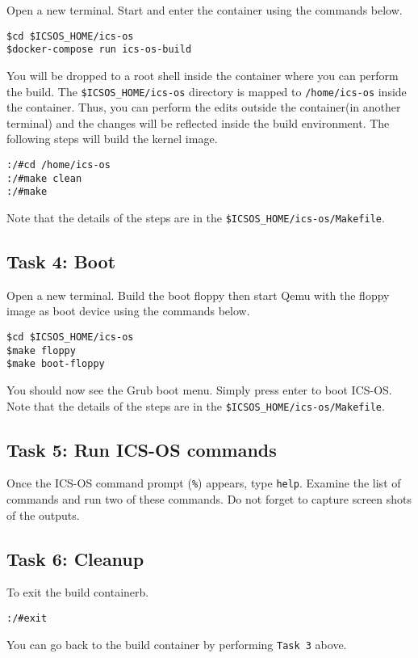 \documentclass[a4paper, 11pt,oneside]{article}
\begin{document}
Open a new terminal. Start and enter the container using the commands below.

\begin{verbatim}
$cd $ICSOS_HOME/ics-os
$docker-compose run ics-os-build
\end{verbatim}

You will be dropped to a root shell inside the container where you can perform 
the build. The \texttt{\$ICSOS\_HOME/ics-os} directory is mapped to 
\texttt{/home/ics-os} inside the container. Thus, you can perform the edits 
outside the container(in another terminal) and the changes will be reflected 
inside the build environment. The following steps will build the kernel image. 

\begin{verbatim}
:/#cd /home/ics-os
:/#make clean
:/#make
\end{verbatim}

Note that the details of the steps are in the 
\texttt{\$ICSOS\_HOME/ics-os/Makefile}.

\subsection*{Task 4: Boot}
Open a new terminal. Build the boot floppy then start Qemu with the floppy 
image as boot device using the commands below. 

\begin{verbatim}
$cd $ICSOS_HOME/ics-os
$make floppy
$make boot-floppy 
\end{verbatim}

You should now see the Grub boot menu. Simply press enter to boot ICS-OS. Note 
that the details of the steps are in the \texttt{\$ICSOS\_HOME/ics-os/Makefile}.

\subsection*{Task 5: Run ICS-OS commands}
Once the ICS-OS command prompt (\texttt{\%}) appears, type \texttt{help}. 
Examine the list of commands and run two of these commands. Do not forget 
to capture screen shots of the outputs.

\subsection*{Task 6: Cleanup}
To exit the build containerb. 
\begin{verbatim}
:/#exit
\end{verbatim}

You can go back to the build container by performing \texttt{Task 3} above.
\end{document}

